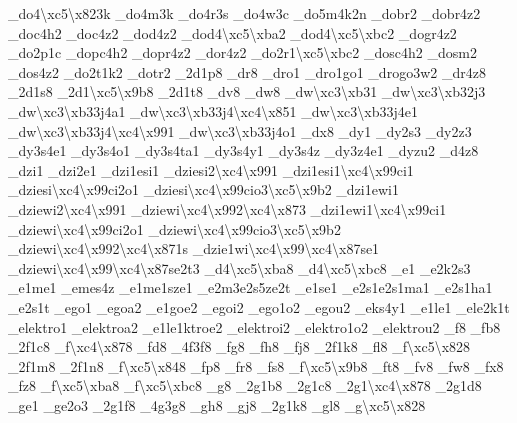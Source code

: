 \begin{DoxyCompactItemize}
\-\_\-do4\textbackslash{}xc5\textbackslash{}x823k \-\_\-do4m3k \-\_\-do4r3s \-\_\-do4w3c \-\_\-do5m4k2n \-\_\-dobr2 \-\_\-dobr4z2 \-\_\-doc4h2 \-\_\-doc4z2 \-\_\-dod4z2 \-\_\-dod4\textbackslash{}xc5\textbackslash{}xba2 \-\_\-dod4\textbackslash{}xc5\textbackslash{}xbc2 \-\_\-dogr4z2 \-\_\-do2p1c \-\_\-dopc4h2 \-\_\-dopr4z2 \-\_\-dor4z2 \-\_\-do2r1\textbackslash{}xc5\textbackslash{}xbc2 \-\_\-dosc4h2 \-\_\-dosm2 \-\_\-dos4z2 \-\_\-do2t1k2 \-\_\-dotr2 \-\_\-2d1p8 \-\_\-dr8 \-\_\-dro1 \-\_\-dro1go1 \-\_\-drogo3w2 \-\_\-dr4z8 \-\_\-2d1s8 \-\_\-2d1\textbackslash{}xc5\textbackslash{}x9b8 \-\_\-2d1t8 \-\_\-dv8 \-\_\-dw8 \-\_\-dw\textbackslash{}xc3\textbackslash{}xb31 \-\_\-dw\textbackslash{}xc3\textbackslash{}xb32j3 \-\_\-dw\textbackslash{}xc3\textbackslash{}xb33j4a1 \-\_\-dw\textbackslash{}xc3\textbackslash{}xb33j4\textbackslash{}xc4\textbackslash{}x851 \-\_\-dw\textbackslash{}xc3\textbackslash{}xb33j4e1 \-\_\-dw\textbackslash{}xc3\textbackslash{}xb33j4\textbackslash{}xc4\textbackslash{}x991 \-\_\-dw\textbackslash{}xc3\textbackslash{}xb33j4o1 \-\_\-dx8 \-\_\-dy1 \-\_\-dy2s3 \-\_\-dy2z3 \-\_\-dy3s4e1 \-\_\-dy3s4o1 \-\_\-dy3s4ta1 \-\_\-dy3s4y1 \-\_\-dy3s4z \-\_\-dy3z4e1 \-\_\-dyzu2 \-\_\-d4z8 \-\_\-dzi1 \-\_\-dzi2e1 \-\_\-dzi1esi1 \-\_\-dziesi2\textbackslash{}xc4\textbackslash{}x991 \-\_\-dzi1esi1\textbackslash{}xc4\textbackslash{}x99ci1 \-\_\-dziesi\textbackslash{}xc4\textbackslash{}x99ci2o1 \-\_\-dziesi\textbackslash{}xc4\textbackslash{}x99cio3\textbackslash{}xc5\textbackslash{}x9b2 \-\_\-dzi1ewi1 \-\_\-dziewi2\textbackslash{}xc4\textbackslash{}x991 \-\_\-dziewi\textbackslash{}xc4\textbackslash{}x992\textbackslash{}xc4\textbackslash{}x873 \-\_\-dzi1ewi1\textbackslash{}xc4\textbackslash{}x99ci1 \-\_\-dziewi\textbackslash{}xc4\textbackslash{}x99ci2o1 \-\_\-dziewi\textbackslash{}xc4\textbackslash{}x99cio3\textbackslash{}xc5\textbackslash{}x9b2 \-\_\-dziewi\textbackslash{}xc4\textbackslash{}x992\textbackslash{}xc4\textbackslash{}x871s \-\_\-dzie1wi\textbackslash{}xc4\textbackslash{}x99\textbackslash{}xc4\textbackslash{}x87se1 \-\_\-dziewi\textbackslash{}xc4\textbackslash{}x99\textbackslash{}xc4\textbackslash{}x87se2t3 \-\_\-d4\textbackslash{}xc5\textbackslash{}xba8 \-\_\-d4\textbackslash{}xc5\textbackslash{}xbc8 \-\_\-e1 \-\_\-e2k2s3 \-\_\-e1me1 \-\_\-emes4z \-\_\-e1me1sze1 \-\_\-e2m3e2s5ze2t \-\_\-e1se1 \-\_\-e2s1e2s1ma1 \-\_\-e2s1ha1 \-\_\-e2s1t \-\_\-ego1 \-\_\-egoa2 \-\_\-e1goe2 \-\_\-egoi2 \-\_\-ego1o2 \-\_\-egou2 \-\_\-eks4y1 \-\_\-e1le1 \-\_\-ele2k1t \-\_\-elektro1 \-\_\-elektroa2 \-\_\-e1le1ktroe2 \-\_\-elektroi2 \-\_\-elektro1o2 \-\_\-elektrou2 \-\_\-f8 \-\_\-fb8 \-\_\-2f1c8 \-\_\-f\textbackslash{}xc4\textbackslash{}x878 \-\_\-fd8 \-\_\-4f3f8 \-\_\-fg8 \-\_\-fh8 \-\_\-fj8 \-\_\-2f1k8 \-\_\-fl8 \-\_\-f\textbackslash{}xc5\textbackslash{}x828 \-\_\-2f1m8 \-\_\-2f1n8 \-\_\-f\textbackslash{}xc5\textbackslash{}x848 \-\_\-fp8 \-\_\-fr8 \-\_\-fs8 \-\_\-f\textbackslash{}xc5\textbackslash{}x9b8 \-\_\-ft8 \-\_\-fv8 \-\_\-fw8 \-\_\-fx8 \-\_\-fz8 \-\_\-f\textbackslash{}xc5\textbackslash{}xba8 \-\_\-f\textbackslash{}xc5\textbackslash{}xbc8 \-\_\-g8 \-\_\-2g1b8 \-\_\-2g1c8 \-\_\-2g1\textbackslash{}xc4\textbackslash{}x878 \-\_\-2g1d8 \-\_\-ge1 \-\_\-ge2o3 \-\_\-2g1f8 \-\_\-4g3g8 \-\_\-gh8 \-\_\-gj8 \-\_\-2g1k8 \-\_\-gl8 \-\_\-g\textbackslash{}xc5\textbackslash{}x828 
\end{DoxyCompactItemize}
